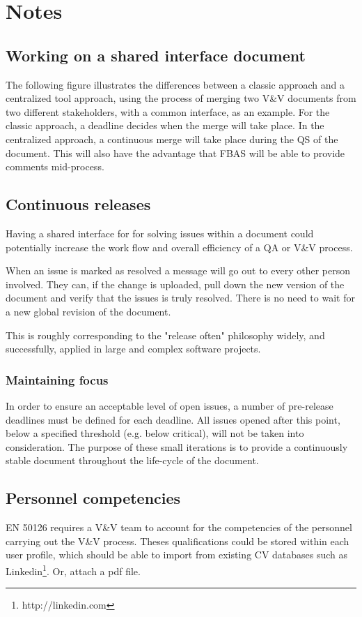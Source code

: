 \documentclass[10pt,a4paper]{article}
\begin{document}
\section{Notes}


\subsection{Working on a shared interface document}
The following figure illustrates the differences between a classic approach and a centralized tool approach, using the process of merging two V\&V documents from two different stakeholders, with a common interface, as an example.
For the classic approach, a deadline decides when the merge will take place. In the centralized approach, a continuous merge will take place during the QS of the document. This will also have the advantage that FBAS will be able to provide comments mid-process.

\subsection{Continuous releases}
Having a shared interface for for solving issues within a document could potentially increase the work flow and overall efficiency of a QA or V\&V process. 

When an issue is marked as resolved a message will go out to every other person involved. They can, if the change is uploaded, pull down the new version of the document and verify that the issues is truly resolved. There is no need to wait for a new global revision of the document.

This is roughly corresponding to the "release often" philosophy widely, and successfully, applied in large and complex software projects.

\subsubsection{Maintaining focus}
In order to ensure an acceptable level of open issues, a number of pre-release deadlines must be defined for each deadline. All issues opened after this point, below a specified threshold (e.g. below critical), will not be taken into consideration. The purpose of these small iterations is to provide a continuously stable document throughout the life-cycle of the document.

\subsection{Personnel competencies}
EN 50126 requires a V\&V team to account for the competencies of the personnel carrying out the V\&V process. Theses qualifications could be stored within each user profile, which should be able to import from existing CV databases such as Linkedin\footnote{http://linkedin.com}. Or, attach a pdf file.
\end{document}
